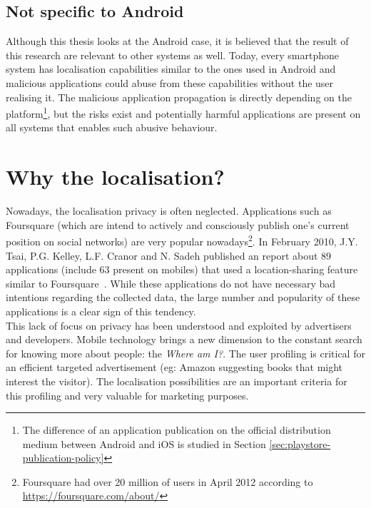 \subsection*{Not specific to Android}
Although this thesis looks at the Android case, it is believed that the result of this research are relevant to other systems as well.
Today, every smartphone system has localisation capabilities similar to the ones used in Android and malicious applications could abuse from these capabilities without the user realising it.
The malicious application propagation is directly depending on the platform\footnote{The difference of an application publication on the official distribution medium between Android and iOS is studied in Section \ref{sec:playstore-publication-policy}}, but the risks exist and potentially harmful applications are present on all systems that enables such abusive behaviour.

\section*{Why the localisation?}
\label{sec:why-localisation}

Nowadays, the localisation privacy is often neglected.
Applications such as Foursquare (which are intend to actively and consciously publish one's current position on social networks) are very popular nowadays\footnote{Foursquare had over 20 million of users in April 2012 according to \url{https://foursquare.com/about/}}.
In February 2010, J.Y. Tsai, P.G. Kelley, L.F. Cranor and N. Sadeh published an report about 89 applications (include 63 present on mobiles) that used a location-sharing feature similar to Foursquare~\cite{loc-share-analysis}.
While these applications do not have necessary bad intentions regarding the collected data, the large number and popularity of these applications is a clear sign of this tendency.\\

This lack of focus on privacy has been understood and exploited by advertisers and developers.
Mobile technology brings a new dimension to the constant search for knowing more about people: the \emph{Where am I?}.
The user profiling is critical for an efficient targeted advertisement (eg: Amazon suggesting books that might interest the visitor).
The localisation possibilities are an important criteria for this profiling and very valuable for marketing purposes.\\

